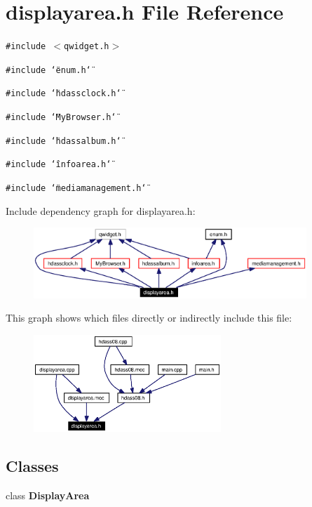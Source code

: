\section{displayarea.h File Reference}
\label{displayarea_8h}


{\tt \#include $<$qwidget.h$>$}\par
{\tt \#include \char`\"{}enum.h\char`\"{}}\par
{\tt \#include \char`\"{}hdassclock.h\char`\"{}}\par
{\tt \#include \char`\"{}My\-Browser.h\char`\"{}}\par
{\tt \#include \char`\"{}hdassalbum.h\char`\"{}}\par
{\tt \#include \char`\"{}infoarea.h\char`\"{}}\par
{\tt \#include \char`\"{}mediamanagement.h\char`\"{}}\par


Include dependency graph for displayarea.h:\begin{figure}[H]
\begin{center}
\leavevmode
\includegraphics[width=292pt]{displayarea_8h__incl}
\end{center}
\end{figure}


This graph shows which files directly or indirectly include this file:\begin{figure}[H]
\begin{center}
\leavevmode
\includegraphics[width=200pt]{displayarea_8h__dep__incl}
\end{center}
\end{figure}
\subsection*{Classes}
\begin{CompactItemize}
\item 
class {\bf Display\-Area}
\end{CompactItemize}
